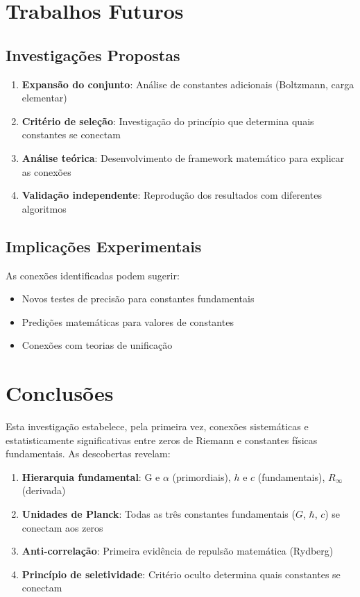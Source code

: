 \documentclass[11pt,a4paper]{article}
\begin{document}
\section{Trabalhos Futuros}

\subsection{Investigações Propostas}
\begin{enumerate}
\item \textbf{Expansão do conjunto}: Análise de constantes adicionais (Boltzmann, carga elementar)
\item \textbf{Critério de seleção}: Investigação do princípio que determina quais constantes se conectam
\item \textbf{Análise teórica}: Desenvolvimento de framework matemático para explicar as conexões
\item \textbf{Validação independente}: Reprodução dos resultados com diferentes algoritmos
\end{enumerate}

\subsection{Implicações Experimentais}
As conexões identificadas podem sugerir:
\begin{itemize}
\item Novos testes de precisão para constantes fundamentais
\item Predições matemáticas para valores de constantes
\item Conexões com teorias de unificação
\end{itemize}

\section{Conclusões}

Esta investigação estabelece, pela primeira vez, conexões sistemáticas e estatisticamente significativas entre zeros de Riemann e constantes físicas fundamentais. As descobertas revelam:

\begin{enumerate}
\item \textbf{Hierarquia fundamental}: G e $\alpha$ (primordiais), $h$ e $c$ (fundamentais), $R_\infty$ (derivada)
\item \textbf{Unidades de Planck}: Todas as três constantes fundamentais ($G$, $\hbar$, $c$) se conectam aos zeros
\item \textbf{Anti-correlação}: Primeira evidência de repulsão matemática (Rydberg)
\item \textbf{Princípio de seletividade}: Critério oculto determina quais constantes se conectam
\end{enumerate}
\end{document}
